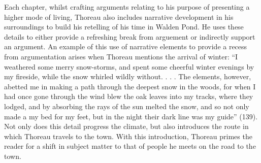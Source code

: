 \documentclass[12pt]{article}
\begin{document}
Each chapter, whilst crafting arguments relating to his purpose of presenting a higher mode of living, Thoreau also includes narrative development in his surroundings to build his retelling of his time in Walden Pond. He uses these details to either provide a refreshing break from arguement or indirectly support an argument. An example of this use of narrative elements to provide a recess from argumentation arises when Thoreau mentions the arrival of winter: ``I weathered some merry snow-storms, and spent some cheerful winter evenings by my fireside, while the snow whirled wildly without. . . . The elements, however, abetted me in making a path through the deepest snow in the woods, for when I had once gone through the wind blew the oak leaves into my tracks, where they lodged, and by absorbing the rays of the sun melted the snow, and so not only made a my bed for my feet, but in the night their dark line was my guide'' (139).
Not only does this detail progress the climate, but also introduces the route in which Thoreau travels to the town. With this introduction, Thoreau primes the reader for a shift in subject matter to that of people he meets on the road to the town.
\end{document}
